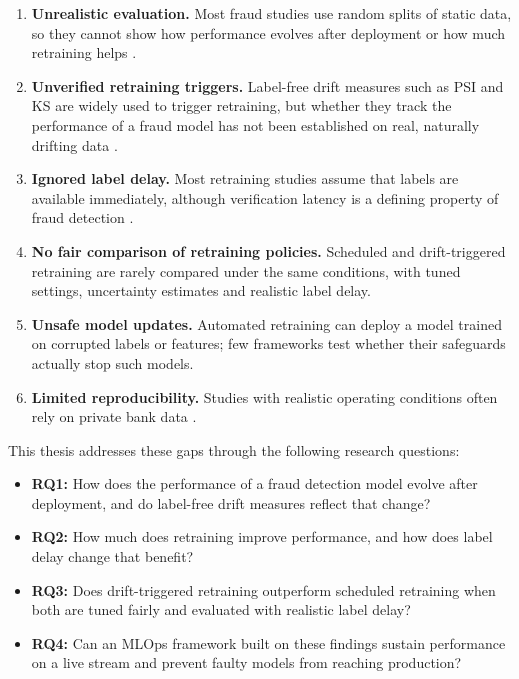 \begin{enumerate}
  \item \textbf{Unrealistic evaluation.} Most fraud studies use random splits of static data, so they cannot show how performance evolves after deployment or how much retraining helps \cite{abdelnaby2023,mienye2023}.
  \item \textbf{Unverified retraining triggers.} Label-free drift measures such as PSI and KS are widely used to trigger retraining, but whether they track the performance of a fraud model has not been established on real, naturally drifting data \cite{shakil2025,wong2025}.
  \item \textbf{Ignored label delay.} Most retraining studies assume that labels are available immediately, although verification latency is a defining property of fraud detection \cite{dalpozzolo2018,amekoe2024}.
  \item \textbf{No fair comparison of retraining policies.} Scheduled and drift-triggered retraining are rarely compared under the same conditions, with tuned settings, uncertainty estimates and realistic label delay.
  \item \textbf{Unsafe model updates.} Automated retraining can deploy a model trained on corrupted labels or features; few frameworks test whether their safeguards actually stop such models.
  \item \textbf{Limited reproducibility.} Studies with realistic operating conditions often rely on private bank data \cite{dalpozzolo2018,somasundaram2019,aldaoud2025}.
\end{enumerate}

This thesis addresses these gaps through the following research questions:

\begin{itemize}[label={}, leftmargin=2em]
  \item \textbf{RQ1:} How does the performance of a fraud detection model evolve after deployment, and do label-free drift measures reflect that change?
  \item \textbf{RQ2:} How much does retraining improve performance, and how does label delay change that benefit?
  \item \textbf{RQ3:} Does drift-triggered retraining outperform scheduled retraining when both are tuned fairly and evaluated with realistic label delay?
  \item \textbf{RQ4:} Can an MLOps framework built on these findings sustain performance on a live stream and prevent faulty models from reaching production?
\end{itemize}

